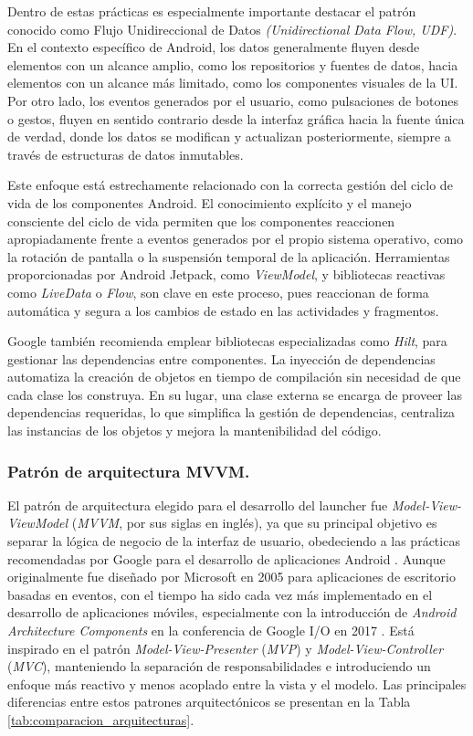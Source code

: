 Dentro de estas prácticas es especialmente importante destacar el patrón conocido como Flujo Unidireccional de Datos \textit{(Unidirectional Data Flow, UDF)}. En el contexto específico de Android, los datos generalmente fluyen desde elementos con un alcance amplio, como los repositorios y fuentes de datos, hacia elementos con un alcance más limitado, como los componentes visuales de la UI. Por otro lado, los eventos generados por el usuario, como pulsaciones de botones o gestos, fluyen en sentido contrario desde la interfaz gráfica hacia la fuente única de verdad, donde los datos se modifican y actualizan posteriormente, siempre a través de estructuras de datos inmutables.

Este enfoque está estrechamente relacionado con la correcta gestión del ciclo de vida de los componentes Android. El conocimiento explícito y el manejo consciente del ciclo de vida permiten que los componentes reaccionen apropiadamente frente a eventos generados por el propio sistema operativo, como la rotación de pantalla o la suspensión temporal de la aplicación. Herramientas proporcionadas por Android Jetpack, como \textit{ViewModel}, y bibliotecas reactivas como \textit{LiveData} o \textit{Flow}, son clave en este proceso, pues reaccionan de forma automática y segura a los cambios de estado en las actividades y fragmentos.

Google también recomienda emplear bibliotecas especializadas como \textit{Hilt}, para gestionar las dependencias entre componentes. La inyección de dependencias automatiza la creación de objetos en tiempo de compilación sin necesidad de que cada clase los construya. En su lugar, una clase externa se encarga de proveer las dependencias requeridas, lo que simplifica la gestión de dependencias, centraliza las instancias de los objetos y mejora la mantenibilidad del código.


\subsubsection{Patrón de arquitectura MVVM.}

El patrón de arquitectura elegido para el desarrollo del launcher fue \textit{Model-View-ViewModel} (\textit{MVVM}, por sus siglas en inglés), ya que su principal objetivo es separar la lógica de negocio de la interfaz de usuario, obedeciendo a las prácticas recomendadas por Google para el desarrollo de aplicaciones Android \cite{AndroidBestPractices}. Aunque originalmente fue diseñado por Microsoft en 2005 para aplicaciones de escritorio basadas en eventos, con el tiempo ha sido cada vez más implementado en el desarrollo de aplicaciones móviles, especialmente con la introducción de \textit{Android Architecture Components} en la conferencia de Google I/O en 2017 \cite{ArchitectureComponents}. Está inspirado en el patrón \textit{Model-View-Presenter} (\textit{MVP}) y \textit{Model-View-Controller} (\textit{MVC}), manteniendo la separación de responsabilidades e introduciendo un enfoque más reactivo y menos acoplado entre la vista y el modelo. Las principales diferencias entre estos patrones arquitectónicos se presentan en la Tabla \ref{tab:comparacion_arquitecturas}.

